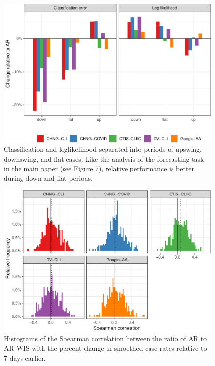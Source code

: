 \documentclass[9pt,twoside,lineno]{pnas-new}
\begin{document}
\clearpage

\begin{figure}

{\centering \includegraphics[width=\textwidth]{fig/hotspots-upswing-downswing-1} 

}

\caption{Classification and loglikelihood separated into periods of upswing, downswing, and flat cases. Like the analysis of the forecasting task in the main paper (see Figure 7), relative performance is better during down and flat periods.}\label{fig:hotspots-upswing-downswing}
\end{figure}

\clearpage

\begin{figure}

{\centering \includegraphics[width=\textwidth]{fig/cor-wis-ratio-1} 

}

\caption{Histograms of the Spearman correlation between the ratio of AR to AR WIS with the percent change in smoothed case rates relative to 7 days earlier.}\label{fig:cor-wis-ratio}
\end{figure}
\end{document}
